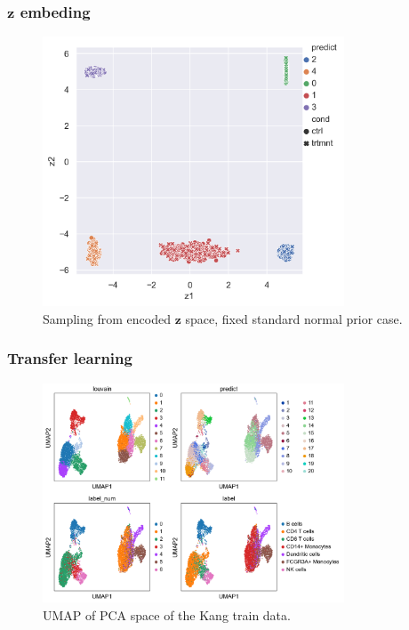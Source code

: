 \documentclass[final]{beamer}
\theoremstyle{plain}
\theoremstyle{definition}
\theoremstyle{remark}
\newcommand{\z}{\mathbf{z}}
\begin{document}
\begin{frame}
\frametitle{$\z$ embeding}
\begin{figure}[h]
\centering
\includegraphics[width=0.8\textwidth]{images/blobs_cgmvae_stdprior_z.png}
\caption{Sampling from encoded $\z$ space, fixed standard normal prior case.
}
\label{fig:blobs_nop_z}
\end{figure}
\end{frame}

\begin{frame}
\frametitle{Transfer learning}
\begin{figure}[h]
\centering
\includegraphics[width=0.8\textwidth]{images/gmmvae_Kang_control_train_us_21c_umap.png}
\caption{
UMAP of PCA space of the Kang train data. 
}
\label{fig:kang_control_train_gmvae_us_umap}
\end{figure}
\end{frame}
\end{document}
